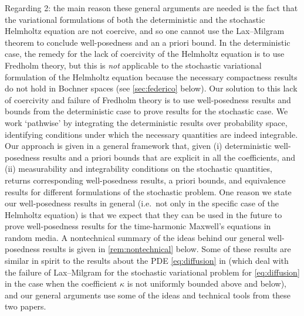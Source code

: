 Regarding 2: the main reason these general arguments are needed is the fact that the variational formulations of both the deterministic and the stochastic Helmholtz equation are not coercive, and so one cannot use the Lax--Milgram theorem to conclude well-posedness and an a priori bound.  In the deterministic case, the remedy for the lack of coercivity of the Helmholtz equation is to use Fredholm theory, but this is \emph{not} applicable to the stochastic variational formulation of the Helmholtz equation because the necessary compactness results do not hold in Bochner spaces (see \cref{sec:federico} below). Our solution to this lack of coercivity and failure of Fredholm theory is to use well-posedness results and bounds from the deterministic case to prove results for the stochastic case. We work `pathwise' by integrating the deterministic results over probability space, identifying conditions under which the necessary quantities are indeed integrable. Our approach is given in a general framework that, given (i) deterministic well-posedness results and a priori bounds that are explicit in all the coefficients, and (ii) measurability and integrability conditions on the stochastic quantities, returns corresponding well-posedness results, a priori bounds, and equivalence results for different formulations of the stochastic problem. One reason we state our well-posedness results in general (i.e.~not only in the specific case of the Helmholtz equation) is that we expect that they can be used in the future to prove well-posedness results for the time-harmonic Maxwell's equations in random media. A nontechnical summary of the ideas behind our general well-posedness results is given in \cref{rem:nontechnical} below. Some of these results are similar in spirit to the results about the PDE \eqref{eq:diffusion} in \cite{Gi:10,MuSt:11} (which deal with the failure of Lax--Milgram for the stochastic variational problem for \eqref{eq:diffusion} in the case when the coefficient $\kappa$ is not uniformly bounded above and below), and our general arguments use some of the ideas and technical tools from these two papers. 
